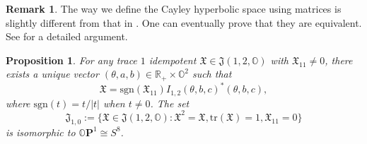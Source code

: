 \documentclass{article}
\newcommand{\isom}{\cong} %
\newcommand{\OO}{\mathbb{O}}
\newcommand{\RR}{\mathbb{R}}
\newcommand{\tr}{\mathrm{tr}}
\newcommand{\FFJ}{\mathfrak{J}}
\newcommand{\FFX}{\mathfrak{X}}
\newtheorem{prop}[thm]{Proposition}
\theoremstyle{definition}
\newtheorem*{rmk}{Remark}
\begin{document}
\begin{rmk}
The way we define the Cayley hyperbolic space using matrices is slightly different from that in \cite[\S19 Spaces of $\RR$-rank 1]{Mostow73}. One can eventually prove that they are equivalent. See \cite[Proposition A.4]{Ruan1} for a detailed argument.
\end{rmk}
\begin{prop}\label{model_equiv_OH^2}
For any trace $1$ idempotent $\FFX\in\FFJ(1,2,\OO)$ with $\FFX_{11}\neq 0$, there exists a unique vector $(\theta,a,b)\in\RR_+\times\OO^2$ such that 
$$\FFX=\mathrm{sgn}(\FFX_{11})I_{1,2}(\theta,b,c)^*(\theta,b,c),$$
where $\mathrm{sgn}(t)=t/|t|$ when $t\neq 0$. The set
$$\FFJ_{1,0}:=\{\FFX\in\FFJ(1,2,\OO):\FFX^2=\FFX,\tr(\FFX)=1,\FFX_{11}=0\}$$
is isomorphic to $\OO\mathbf{P}^1\isom S^8$.
\end{prop}
\end{document}
